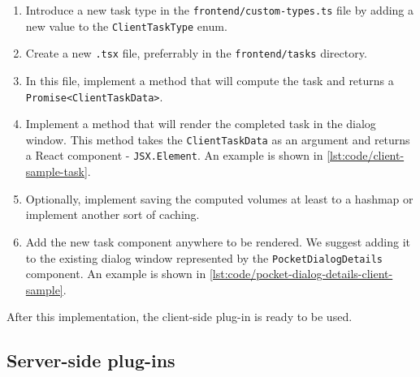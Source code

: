 \begin{enumerate}
    \item Introduce a new task type in the \texttt{frontend/custom-types.ts} file by adding a new value to the \texttt{ClientTaskType} enum.
    \item Create a new \texttt{.tsx} file, preferrably in the \texttt{frontend/tasks} directory.
    \item In this file, implement a method that will compute the task and returns a \texttt{Promise<ClientTaskData>}.
    \item Implement a method that will render the completed task in the dialog window. This method takes the \texttt{ClientTaskData} as an argument and returns a React component - \texttt{JSX.Element}. An example is shown in \cref{lst:code/client-sample-task}.
    \item Optionally, implement saving the computed volumes at least to a hashmap or implement another sort of caching.
    \item Add the new task component anywhere to be rendered. We suggest adding it to the existing dialog window represented by the \texttt{PocketDialogDetails} component. An example is shown in \cref{lst:code/pocket-dialog-details-client-sample}.
\end{enumerate}



After this implementation, the client-side plug-in is ready to be used.



\subsection{Server-side plug-ins}
\label{subsec:dev_server_side}


